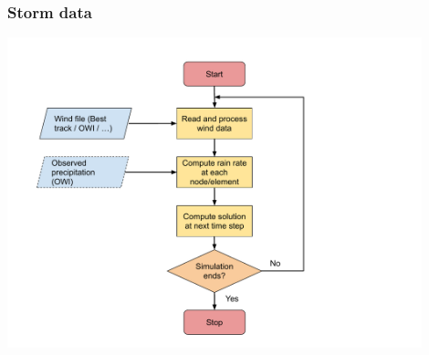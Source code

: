 \documentclass[10pt]{oden_beamer}
\begin{document}
\begin{frame}
  \frametitle{Storm data}
  \centering
  \includegraphics[width=0.9\textwidth]{flowchart.pdf}
\end{frame}
\end{document}
